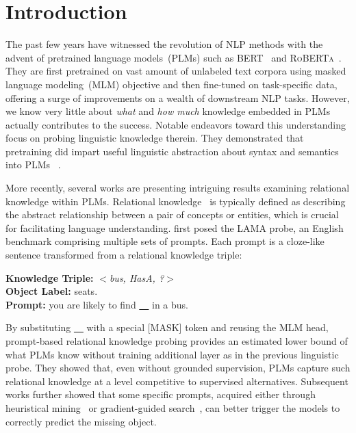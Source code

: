\section{Introduction}
The past few years have witnessed the revolution of NLP methods with 
the advent of pretrained language models~(PLMs) such as 
\textsc{BERT}~\citep{DBLP:journals/corr/abs-1810-04805} and 
\textsc{RoBERTa}~\citep{DBLP:journals/corr/abs-1907-11692}. They are first pretrained on vast amount of unlabeled text corpora using masked language modeling~(MLM) objective and 
then fine-tuned on task-specific data, offering a surge of 
improvements on a wealth of downstream NLP tasks. However, we know very little about
\textit{what} and \textit{how much} 
knowledge embedded in PLMs actually contributes to the success. 
Notable endeavors toward this understanding focus on probing linguistic knowledge therein. They demonstrated that 
pretraining did impart useful linguistic abstraction about syntax and semantics into PLMs ~\citep{peters-etal-2018-dissecting,DBLP:journals/corr/abs-1901-05287,DBLP:journals/corr/abs-1905-06316}.


More recently, several works are presenting intriguing results examining 
 relational knowledge within PLMs. Relational knowledge~\citep{speer-havasi-2012-representing,wikidata} is typically defined as describing the abstract relationship between a pair of concepts or entities, which is crucial for facilitating language understanding.
 \citet{Petroni2020} first posed the LAMA probe, 
 an English benchmark comprising multiple sets of prompts. Each prompt is a cloze-like sentence transformed from a relational knowledge triple:
 
 \noindent
 \textbf{Knowledge Triple: }\textit{$<$bus, HasA, ?$>$} \\
 \textbf{Object Label: }seats. \\
 \textbf{Prompt: }you are likely to find \underline{~~} in a bus.

 

By substituting  \underline{~~}  with a special [MASK] token and reusing the MLM head, prompt-based relational knowledge probing provides an estimated lower bound of what PLMs know without training additional layer as in the previous linguistic probe. They showed that, even without grounded supervision, 
PLMs capture such relational knowledge at a level competitive to supervised alternatives. Subsequent works further showed that some specific prompts, acquired either through heuristical mining~\citep{DBLP:journals/corr/abs-1911-12543} or gradient-guided search~\citep{Shin2020}, can better trigger the models to correctly predict the missing object. 

